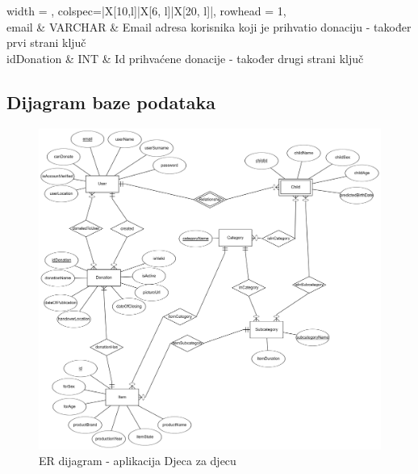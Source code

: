 				\begin{longtblr}[
					label=none,
					entry=none
					]{
						width = \textwidth,
						colspec={|X[10,l]|X[6, l]|X[20, l]|}, 
						rowhead = 1,
					}
					\hline {}	 \\ \hline[3pt]
					 email & VARCHAR & Email adresa korisnika koji je prihvatio donaciju - također prvi strani ključ	\\ \hline
					 idDonation & INT & Id prihvaćene donacije - također drugi strani ključ \\ \hline
				\end{longtblr}
			
			\subsection{Dijagram baze podataka}
				\begin{figure}[H]
					\includegraphics[width=\textwidth,height=0.7\textheight]{dijagrami/ERdijagram.png}
					\centering
					\caption{ER dijagram - aplikacija Djeca za djecu}
					\label{fig:ERDiagram}
				\end{figure}

